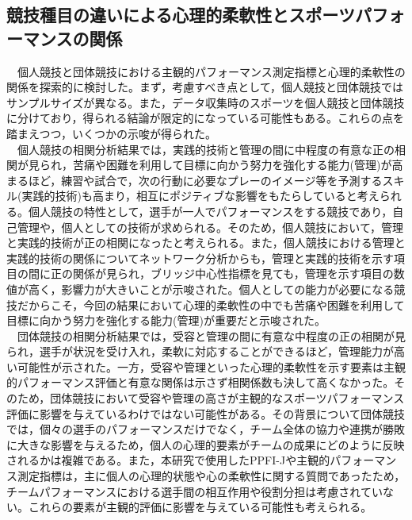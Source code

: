 \documentclass[12pt,a4paper,xelatex,ja=standard]{bxjsarticle}
\begin{document}
\hypertarget{ux7af6ux6280ux7a2eux76eeux306eux9055ux3044ux306bux3088ux308bux5fc3ux7406ux7684ux67d4ux8edfux6027ux3068ux30b9ux30ddux30fcux30c4ux30d1ux30d5ux30a9ux30fcux30deux30f3ux30b9ux306eux95a2ux4fc2}{%
\subsection{競技種目の違いによる心理的柔軟性とスポーツパフォーマンスの関係}\label{ux7af6ux6280ux7a2eux76eeux306eux9055ux3044ux306bux3088ux308bux5fc3ux7406ux7684ux67d4ux8edfux6027ux3068ux30b9ux30ddux30fcux30c4ux30d1ux30d5ux30a9ux30fcux30deux30f3ux30b9ux306eux95a2ux4fc2}}

　個人競技と団体競技における主観的パフォーマンス測定指標と心理的柔軟性の関係を探索的に検討した。まず，考慮すべき点として，個人競技と団体競技ではサンプルサイズが異なる。また，データ収集時のスポーツを個人競技と団体競技に分けており，得られる結論が限定的になっている可能性もある。これらの点を踏まえつつ，いくつかの示唆が得られた。\\
　個人競技の相関分析結果では，実践的技術と管理の間に中程度の有意な正の相関が見られ，苦痛や困難を利用して目標に向かう努力を強化する能力(管理)が高まるほど，練習や試合で，次の行動に必要なプレーのイメージ等を予測するスキル(実践的技術)も高まり，相互にポジティブな影響をもたらしていると考えられる。個人競技の特性として，選手が一人でパフォーマンスをする競技であり，自己管理や，個人としての技術が求められる。そのため，個人競技において，管理と実践的技術が正の相関になったと考えられる。また，個人競技における管理と実践的技術の関係についてネットワーク分析からも，管理と実践的技術を示す項目の間に正の関係が見られ，ブリッジ中心性指標を見ても，管理を示す項目の数値が高く，影響力が大きいことが示唆された。個人としての能力が必要になる競技だからこそ，今回の結果において心理的柔軟性の中でも苦痛や困難を利用して目標に向かう努力を強化する能力(管理)が重要だと示唆された。\\
　団体競技の相関分析結果では，受容と管理の間に有意な中程度の正の相関が見られ，選手が状況を受け入れ，柔軟に対応することができるほど，管理能力が高い可能性が示された。一方，受容や管理といった心理的柔軟性を示す要素は主観的パフォーマンス評価と有意な関係は示さず相関係数も決して高くなかった。そのため，団体競技において受容や管理の高さが主観的なスポーツパフォーマンス評価に影響を与えているわけではない可能性がある。その背景について団体競技では，個々の選手のパフォーマンスだけでなく，チーム全体の協力や連携が勝敗に大きな影響を与えるため，個人の心理的要素がチームの成果にどのように反映されるかは複雑である。また，本研究で使用したPPFI-Jや主観的パフォーマンス測定指標は，主に個人の心理的状態や心の柔軟性に関する質問であったため，チームパフォーマンスにおける選手間の相互作用や役割分担は考慮されていない。これらの要素が主観的評価に影響を与えている可能性も考えられる。\\
\end{document}
